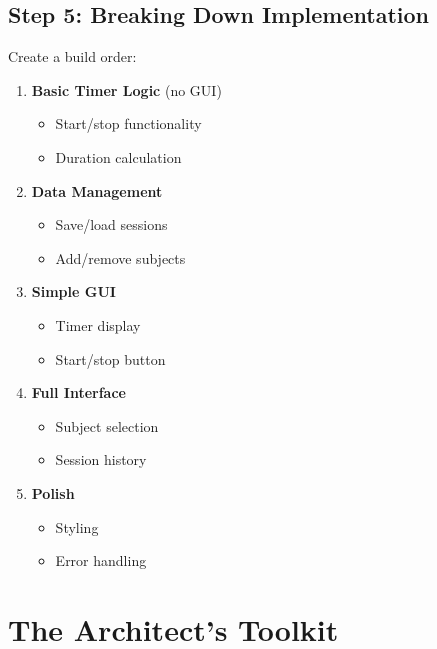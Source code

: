 \documentclass[
  letterpaper,
  DIV=11,
  numbers=noendperiod,
  oneside]{scrreprt}
\providecommand{\tightlist}{%
  \setlength{\itemsep}{0pt}\setlength{\parskip}{0pt}}\usepackage{longtable,booktabs,array}
\begin{document}
\subsection{Step 5: Breaking Down
Implementation}\label{step-5-breaking-down-implementation}

Create a build order:

\begin{enumerate}
\def\labelenumi{\arabic{enumi}.}
\tightlist
\item
  \textbf{Basic Timer Logic} (no GUI)

  \begin{itemize}
  \tightlist
  \item
    Start/stop functionality
  \item
    Duration calculation
  \end{itemize}
\item
  \textbf{Data Management}

  \begin{itemize}
  \tightlist
  \item
    Save/load sessions
  \item
    Add/remove subjects
  \end{itemize}
\item
  \textbf{Simple GUI}

  \begin{itemize}
  \tightlist
  \item
    Timer display
  \item
    Start/stop button
  \end{itemize}
\item
  \textbf{Full Interface}

  \begin{itemize}
  \tightlist
  \item
    Subject selection
  \item
    Session history
  \end{itemize}
\item
  \textbf{Polish}

  \begin{itemize}
  \tightlist
  \item
    Styling
  \item
    Error handling
  \end{itemize}
\end{enumerate}

\section{The Architect's Toolkit}\label{the-architects-toolkit}
\end{document}

